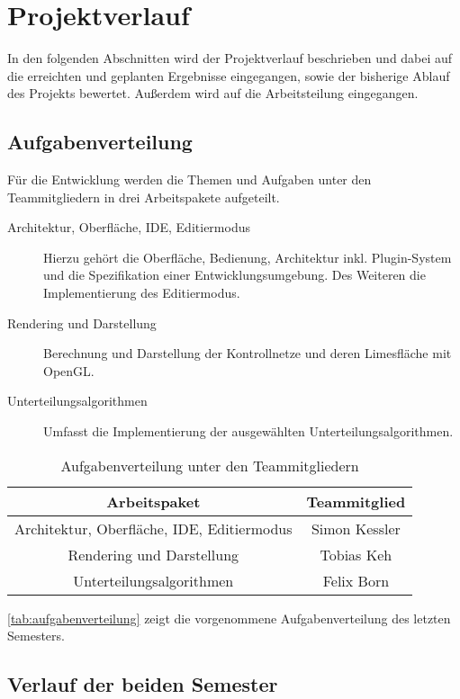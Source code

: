 \chapter{Projektverlauf}

In den folgenden Abschnitten wird der Projektverlauf beschrieben und 
dabei auf die erreichten und geplanten Ergebnisse eingegangen, sowie der bisherige Ablauf des Projekts bewertet. Außerdem wird auf die Arbeitsteilung eingegangen.

\section{Aufgabenverteilung}

Für die Entwicklung werden die Themen und Aufgaben unter den Teammitgliedern in drei Arbeitspakete aufgeteilt.

\begin{description}
\item[Architektur, Oberfläche, IDE, Editiermodus] Hierzu gehört die Oberfläche, Bedienung, Architektur inkl. Plugin-System und die Spezifikation einer Entwicklungsumgebung. Des Weiteren die Implementierung des Editiermodus.
\item[Rendering und Darstellung] Berechnung und Darstellung der Kontrollnetze und deren Limesfläche mit OpenGL.
\item[Unterteilungsalgorithmen] Umfasst die Implementierung der ausgewählten Unterteilungsalgorithmen.
\end{description}

\begin{table}[h]
\center
\caption{Aufgabenverteilung unter den Teammitgliedern}
\begin{tabular}{c|c}
Arbeitspaket & Teammitglied\\
\hline
Architektur, Oberfläche, IDE, Editiermodus & Simon Kessler \\
Rendering und Darstellung & Tobias Keh \\
Unterteilungsalgorithmen & Felix Born \\
\end{tabular}
\label{tab:aufgabenverteilung}
\end{table}

\autoref{tab:aufgabenverteilung} zeigt die vorgenommene Aufgabenverteilung des letzten Semesters.

\section{Verlauf der beiden Semester}

